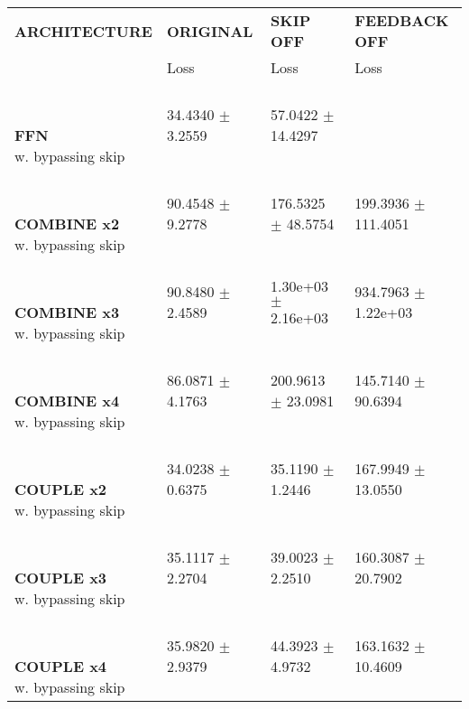 
\begin{table}[ht]
    \centering
    \begin{tabular}{|>{\columncolor{gray!05}}l|l|l|l|}
        \hline
        \rowcolor{white}
        \textbf{\footnotesize ARCHITECTURE} & \textbf{\footnotesize ORIGINAL} & \textbf{\footnotesize SKIP OFF} & \textbf{\footnotesize FEEDBACK OFF} \\

        \rowcolor{white}
        & {\footnotesize Loss} & {\footnotesize Loss} & {\footnotesize Loss} \\
        \hline
\shortstack[l]{\\ {} \\ \textbf{FFN}\\{w. bypassing skip}} & 34.4340 $\pm$ 3.2559 & 57.0422 $\pm$ 14.4297 &  \\
 \hline 
\shortstack[l]{\\ {} \\ \textbf{COMBINE x2}\\{w. bypassing skip}} & 90.4548 $\pm$ 9.2778 & 176.5325 $\pm$ 48.5754 & 199.3936 $\pm$ 111.4051 \\
 \hline 
\shortstack[l]{\\ {} \\ \textbf{COMBINE x3}\\{w. bypassing skip}} & 90.8480 $\pm$ 2.4589 & 1.30e+03 $\pm$ 2.16e+03 & 934.7963 $\pm$ 1.22e+03 \\
 \hline 
\shortstack[l]{\\ {} \\ \textbf{COMBINE x4}\\{w. bypassing skip}} & 86.0871 $\pm$ 4.1763 & 200.9613 $\pm$ 23.0981 & 145.7140 $\pm$ 90.6394 \\
 \hline 
\shortstack[l]{\\ {} \\ \textbf{COUPLE x2}\\{w. bypassing skip}} & 34.0238 $\pm$ 0.6375 & 35.1190 $\pm$ 1.2446 & 167.9949 $\pm$ 13.0550 \\
 \hline 
\shortstack[l]{\\ {} \\ \textbf{COUPLE x3}\\{w. bypassing skip}} & 35.1117 $\pm$ 2.2704 & 39.0023 $\pm$ 2.2510 & 160.3087 $\pm$ 20.7902 \\
 \hline 
\shortstack[l]{\\ {} \\ \textbf{COUPLE x4}\\{w. bypassing skip}} & 35.9820 $\pm$ 2.9379 & 44.3923 $\pm$ 4.9732 & 163.1632 $\pm$ 10.4609 \\

\end{tabular}
\end{table}
